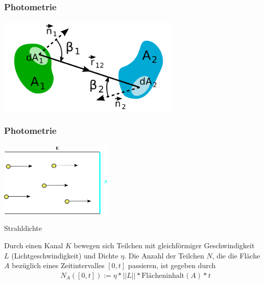 \documentclass{beamer}
\begin{document}
\begin{frame}
    \frametitle{Photometrie}
\framesubtitle{}
  \begin{center}

    \includegraphics[width=0.65\textwidth]{images/Fotometrisches_Grundgesetz_Schema.png}
\end{center}

\end{frame}


\begin{frame}
    \frametitle{Photometrie}
\framesubtitle{}
\begin{center}
    \includegraphics[width=0.4\textwidth]{images/Partikelstrom.png}
\end{center}
\begin{block}{ Strahldichte}

Durch einen Kanal $K$ bewegen  sich Teilchen mit gleichförmiger Geschwindigkeit $L$ (Lichtgeschwindigkeit)  und  Dichte $\eta$.
Die Anzahl der Teilchen $N$, die die Fläche $A$ bezüglich eines Zeitintervalles $[0,t]$ passieren, ist gegeben durch
\begin{align}
& N_A([0,t]) := \eta * ||L||  *   \text{Flächeninhalt}(A) *   t 
\end{align}
\end{block}
\end{frame}
\end{document}
